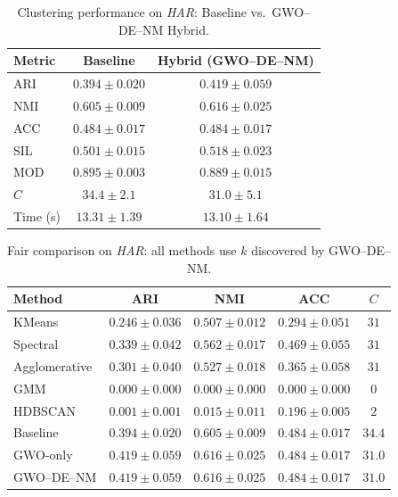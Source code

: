 \begin{table}[htbp]
\centering
\caption{Clustering performance on \textit{HAR}: Baseline vs.\ GWO--DE--NM Hybrid.}
\label{tab:har}
\begin{tabular}{lcc}
\toprule
Metric & Baseline & Hybrid (GWO--DE--NM) \\
\midrule
ARI & $0.394 \pm 0.020$ & $\mathbf{0.419 \pm 0.059}$ \\
NMI & $0.605 \pm 0.009$ & $\mathbf{0.616 \pm 0.025}$ \\
ACC & $0.484 \pm 0.017$ & $\mathbf{0.484 \pm 0.017}$ \\
SIL & $0.501 \pm 0.015$ & $\mathbf{0.518 \pm 0.023}$ \\
MOD & $\mathbf{0.895 \pm 0.003}$ & $0.889 \pm 0.015$ \\
\midrule
$C$ & $34.4 \pm 2.1$ & $31.0 \pm 5.1$ \\
Time (s) & $13.31 \pm 1.39$ & $13.10 \pm 1.64$ \\
\bottomrule
\end{tabular}
\end{table}

\begin{table}[htbp]
\centering\small
\caption{Fair comparison on \textit{HAR}: all methods use $k$ discovered by GWO--DE--NM.}
\label{tab:fair_har}
\begin{tabular}{lcccc}
\toprule
Method & ARI & NMI & ACC & $C$ \\
\midrule
KMeans & $0.246 \pm 0.036$ & $0.507 \pm 0.012$ & $0.294 \pm 0.051$ & $31$ \\
Spectral & $0.339 \pm 0.042$ & $0.562 \pm 0.017$ & $0.469 \pm 0.055$ & $31$ \\
Agglomerative & $0.301 \pm 0.040$ & $0.527 \pm 0.018$ & $0.365 \pm 0.058$ & $31$ \\
GMM & $0.000 \pm 0.000$ & $0.000 \pm 0.000$ & $0.000 \pm 0.000$ & $0$ \\
HDBSCAN & $0.001 \pm 0.001$ & $0.015 \pm 0.011$ & $0.196 \pm 0.005$ & $2$ \\
\midrule
Baseline & $0.394 \pm 0.020$ & $0.605 \pm 0.009$ & $0.484 \pm 0.017$ & $34.4$ \\
GWO-only & $\mathbf{0.419 \pm 0.059}$ & $0.616 \pm 0.025$ & $0.484 \pm 0.017$ & $31.0$ \\
GWO--DE--NM & $0.419 \pm 0.059$ & $0.616 \pm 0.025$ & $0.484 \pm 0.017$ & $31.0$ \\
\bottomrule
\end{tabular}
\end{table}

